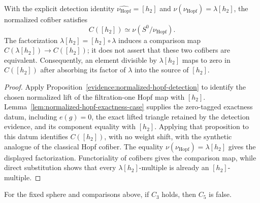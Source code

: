 \begin{proposition}
  \label{prop:synthetic-hopf-cofiber-equivalence}
  \notready
  With the explicit detection identity
  $\widehat{\nu_{\mathrm{Hopf}}}=[h_2]$ and
  $\nu(\nu_{\mathrm{Hopf}})=\lambda[h_2]$, the normalized cofiber satisfies
  \[
    C([h_2])\simeq\nu(S^0/\nu_{\mathrm{Hopf}}).
  \]
  The factorization $\lambda[h_2]=[h_2]\circ\lambda$ induces a comparison map
  $C(\lambda[h_2])\to C([h_2])$; it does not assert that these two cofibers are
  equivalent.  Consequently, an element divisible by $\lambda[h_2]$ maps to
  zero in $C([h_2])$ after absorbing its factor of $\lambda$ into the source of
  $[h_2]$.
\end{proposition}

\begin{proof}
  Apply Proposition~\ref{evidence:normalized-hopf-detection} to identify the
  chosen normalized lift of the filtration-one Hopf map with $[h_2]$.
  Lemma~\ref{lem:normalized-hopf-exactness-case} supplies the zero-tagged
  exactness datum, including $e(g)=0$, the exact lifted triangle retained by
  the detection evidence, and its component equality with $[h_2]$.  Applying that proposition
  to this datum identifies $C([h_2])$, with no weight shift, with the synthetic
  analogue of the classical Hopf cofiber.  The equality
  $\nu(\nu_{\mathrm{Hopf}})=\lambda[h_2]$ gives the displayed factorization.
  Functoriality of cofibers gives the comparison map, while direct substitution
  shows that every $\lambda[h_2]$-multiple is already an $[h_2]$-multiple.
\end{proof}

\begin{proposition}[$C_3$ excludes $C_5$]
  \label{prop:near126-c3-not-c5}
  \notready
  For the fixed sphere and comparisons above, if $C_3$ holds, then $C_5$ is false.
\end{proposition}

